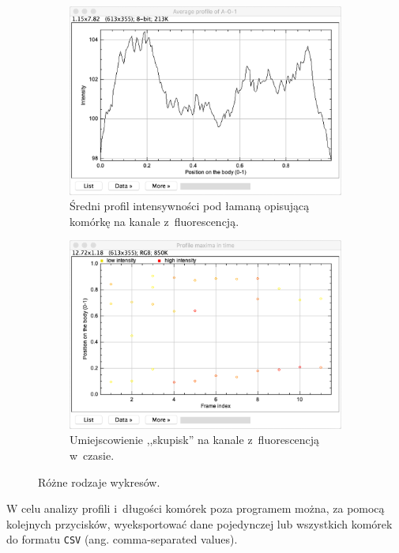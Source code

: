 \documentclass[declaration,shortabstract,mgr]{iithesis}
\begin{document}
\begin{figure}
  \begin{subfigure}[t]{.45\textwidth}
    \centering
    \includegraphics[width=\textwidth]{images/ui-plot-avg-profile.png}
    \caption{\centering Średni profil intensywności pod łamaną opisującą komórkę na kanale z~fluorescencją.}
  \end{subfigure}
  \hfill
  \begin{subfigure}[t]{.45\textwidth}
    \centering
    \includegraphics[width=\textwidth]{images/ui-plot-picks.png}
    \caption{\centering Umiejscowienie ,,skupisk'' na kanale z~fluorescencją w~czasie.}
  \end{subfigure}
  \hfill

  \caption{Różne rodzaje wykresów.}
  \label{fig:ui-plots}
\end{figure}

W celu analizy profili i~długości komórek poza programem można, za pomocą kolejnych przycisków, wyeksportować dane pojedynczej lub wszystkich komórek do formatu \texttt{CSV} (ang. comma-separated values).
\end{document}
